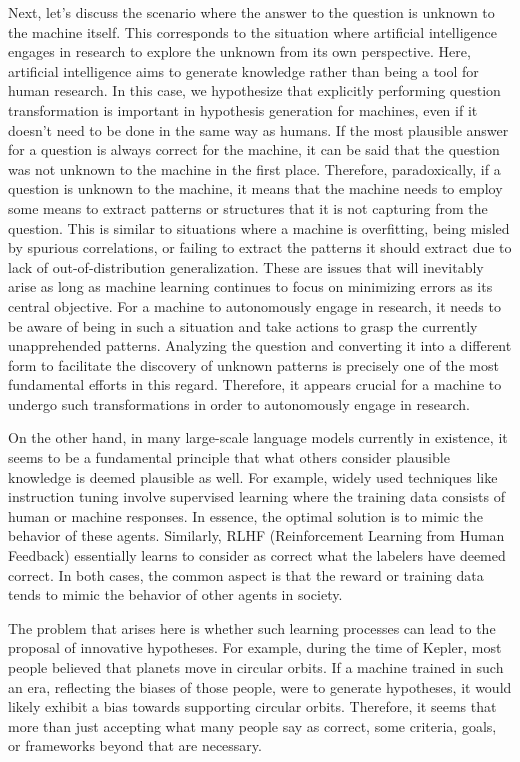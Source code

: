 \documentclass{book}
\begin{document}
Next, let's discuss the scenario where the answer to the question is unknown to the machine itself. This corresponds to the situation where artificial intelligence engages in research to explore the unknown from its own perspective. Here, artificial intelligence aims to generate knowledge rather than being a tool for human research. In this case, we hypothesize that explicitly performing question transformation is important in hypothesis generation for machines, even if it doesn't need to be done in the same way as humans. If the most plausible answer for a question is always correct for the machine, it can be said that the question was not unknown to the machine in the first place. Therefore, paradoxically, if a question is unknown to the machine, it means that the machine needs to employ some means to extract patterns or structures that it is not capturing from the question. This is similar to situations where a machine is overfitting, being misled by spurious correlations, or failing to extract the patterns it should extract due to lack of out-of-distribution generalization. These are issues that will inevitably arise as long as machine learning continues to focus on minimizing errors as its central objective. For a machine to autonomously engage in research, it needs to be aware of being in such a situation and take actions to grasp the currently unapprehended patterns. Analyzing the question and converting it into a different form to facilitate the discovery of unknown patterns is precisely one of the most fundamental efforts in this regard. Therefore, it appears crucial for a machine to undergo such transformations in order to autonomously engage in research.

On the other hand, in many large-scale language models currently in existence, it seems to be a fundamental principle that what others consider plausible knowledge is deemed plausible as well. For example, widely used techniques like instruction tuning involve supervised learning where the training data consists of human or machine responses. In essence, the optimal solution is to mimic the behavior of these agents. Similarly, RLHF (Reinforcement Learning from Human Feedback) essentially learns to consider as correct what the labelers have deemed correct. In both cases, the common aspect is that the reward or training data tends to mimic the behavior of other agents in society.

The problem that arises here is whether such learning processes can lead to the proposal of innovative hypotheses. For example, during the time of Kepler, most people believed that planets move in circular orbits. If a machine trained in such an era, reflecting the biases of those people, were to generate hypotheses, it would likely exhibit a bias towards supporting circular orbits. Therefore, it seems that more than just accepting what many people say as correct, some criteria, goals, or frameworks beyond that are necessary.
\end{document}
